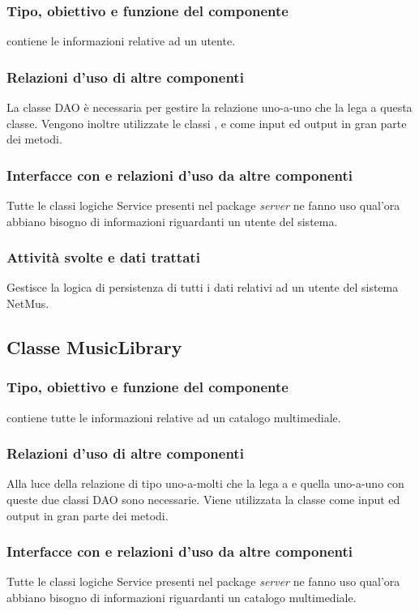 \subsubsection*{Tipo, obiettivo e funzione del componente}
 contiene le informazioni relative ad un utente.
\subsubsection*{Relazioni d'uso di altre componenti}
La classe DAO  \`e necessaria per gestire la relazione uno-a-uno
che la lega a questa classe. Vengono inoltre utilizzate le classi
,  e  come input ed
output in gran parte dei metodi. 
\subsubsection*{Interfacce con e relazioni d'uso da altre componenti}
Tutte le classi logiche Service presenti nel package \emph{server} ne fanno uso
qual'ora abbiano bisogno di informazioni riguardanti un utente del sistema.
\subsubsection*{Attivit\`a svolte e dati trattati}
Gestisce la logica di persistenza di tutti i dati relativi ad un utente del
sistema NetMus.

\subsection{Classe MusicLibrary}
\subsubsection*{Tipo, obiettivo e funzione del componente} 
contiene tutte le informazioni relative ad un catalogo multimediale.
\subsubsection*{Relazioni d'uso di altre componenti} Alla luce della relazione
di tipo uno-a-molti che la lega a  e quella uno-a-uno con
 queste due classi DAO sono necessarie. Viene utilizzata la
classe  come input ed output in gran parte dei metodi.
\subsubsection*{Interfacce con e relazioni d'uso da altre componenti} Tutte le
classi logiche Service presenti nel package \emph{server} ne fanno uso qual'ora
abbiano bisogno di informazioni riguardanti un catalogo multimediale.

